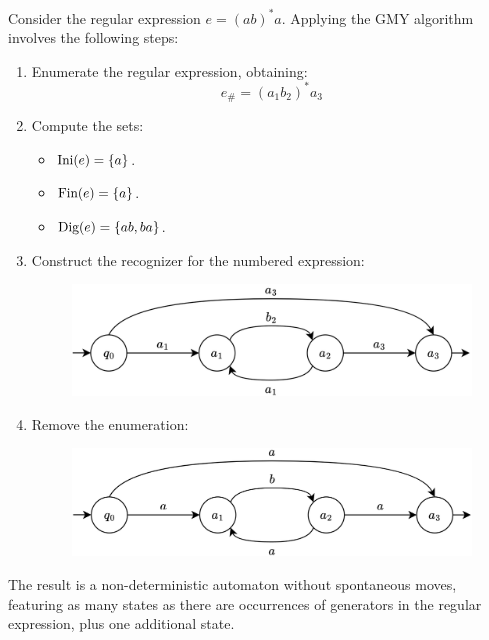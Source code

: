 \begin{example}
    Consider the regular expression $e=(ab)^{\ast}a$.
    Applying the GMY algorithm involves the following steps:
    \begin{enumerate}
        \item Enumerate the regular expression, obtaining: 
            \[e_{\#}=(a_1b_2)^{\ast}a_3\]
        \item Compute the sets:
            \begin{itemize}
                \item $\textnormal{Ini}(e)=\{a\}$.
                \item $\textnormal{Fin}(e)=\{a\}$.
                \item $\textnormal{Dig}(e)=\{ab,ba\}$.
            \end{itemize}
        \item Construct the recognizer for the numbered expression:
            \begin{figure}[H]
                \centering
                \includegraphics[width=0.75\linewidth]{images/gmy1.png}
            \end{figure}
        \item Remove the enumeration: 
            \begin{figure}[H]
                \centering
                \includegraphics[width=0.75\linewidth]{images/gmy2.png}
            \end{figure}
    \end{enumerate}
    The result is a non-deterministic automaton without spontaneous moves, featuring as many states as there are occurrences of generators in the regular expression, plus one additional state.
\end{example}

